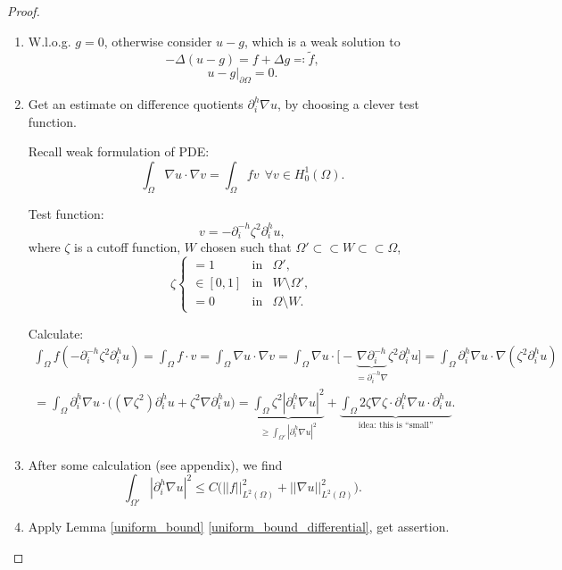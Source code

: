 \documentclass[12pt]{article}
\theoremstyle{definition}
\begin{document}
\begin{proof}
\begin{enumerate}[label=\arabic*.]
\item W.l.o.g. $g=0$, otherwise consider $u-g$, which is a weak solution to
\[-\Delta(u-g)=f+\Delta g\eqqcolon\tilde f,\]
\[u-g|_{\partial\Omega}=0.\]

\item Get an estimate on difference quotients $\partial_i^h\nabla u$, by choosing a clever test function.

Recall weak formulation of PDE:
\begin{equation}\tag{W}\label{Weak}
\int_\Omega\nabla u\cdot\nabla v=\int_\Omega fv\ \ \forall v\in H_0^1(\Omega).
\end{equation}

Test function:
\[v=-\partial_i^{-h}\zeta^2\partial_i^hu,\]
where $\zeta$ is a cutoff function, $W$ chosen such that $\Omega'\subset\subset W\subset\subset\Omega$,
\[\zeta\left\{\begin{array}{lcl}=1&\text{in}&\Omega',\\\in[0,1]&\text{in}&W\setminus\Omega',\\=0&\text{in}&\Omega\setminus W.\end{array}\right.\]

Calculate:
\begin{multline*}
\int_\Omega f(-\partial_i^{-h}\zeta^2\partial_i^hu)=\int_\Omega f\cdot v=\int_\Omega\nabla u\cdot\nabla v=\int_\Omega\nabla u\cdot\big[-\underbrace{\nabla\partial_i^{-h}}_{=\partial_i^{-h}\nabla}\zeta^2\partial_i^hu\big]=\int_\Omega\partial_i^h\nabla u\cdot\nabla(\zeta^2\partial_i^hu)\\
=\int_\Omega\partial_i^h\nabla u\cdot\big((\nabla\zeta^2)\partial_i^hu+\zeta^2\nabla\partial_i^hu\big)=\underbrace{\int_\Omega\zeta^2|\partial_i^h\nabla u|^2}_{\geq\int_{\Omega'}|\partial_i^h\nabla u|^2}+\underbrace{\int_\Omega2\zeta\nabla\zeta\cdot\partial_i^h\nabla u\cdot\partial_i^hu}_{\text{idea: this is ``small''}}.
\end{multline*}

\item\label{reference_appendix} After some calculation (see appendix), we find
\[\int_{\Omega'}|\partial_i^h\nabla u|^2\leq C\big(||f||_{L^2(\Omega)}^2+||\nabla u||_{L^2(\Omega)}^2\big).\]

\item Apply Lemma \ref{uniform_bound} \ref{uniform_bound_differential}, get assertion.
\end{enumerate}
\end{proof}
\end{document}

